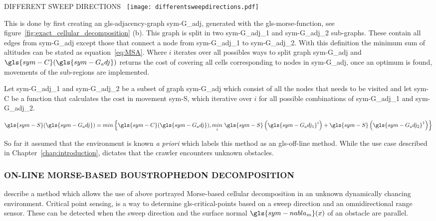 \begin{RoyalFigure}[!htb]{DIFFERENT SWEEP DIRECTIONS~\cite{huang_optimal_2001}}
    \texttt{[image: differentsweepdirections.pdf]}
\end{RoyalFigure}

This is done by first creating an \gls{gls-adjacency-graph} \gls{sym-G_adj}, generated with the
\gls{gls-morse-function}, see figure~\ref{fig:exact_cellular_decomposition} (b). This graph is split in two
\gls{sym-G_adj_1}  and \gls{sym-G_adj_2} sub-graphs. These contain all edges from \gls{sym-G_adj} except those that
connect a node from \gls{sym-G_adj_1} to \gls{sym-G_adj_2}. With this definition the minimum sum of altitudes can be
stated as equation~\ref{eq:MSA}. Where \( i \) iterates over all possibles ways to split graph \gls{sym-G_adj} and \(
\gls{sym-C}(\gls{sym-G_adj} ) \) returns the cost of covering all cells corresponding to nodes in \gls{sym-G_adj}, once
an optimum is found, movements of the sub-regions are implemented.

Let \gls{sym-G_adj_1} and \gls{sym-G_adj_2} be a subset of graph \gls{sym-G_adj} which consist of all the nodes that
needs to be visited and let \gls{sym-C} be a function that calculates the cost in movement \gls{sym-S}, which iterative
over \( i \) for all possible combinations of \gls{sym-G_adj_1} and \gls{sym-G_adj_2}.

\begin{equation}
    \label{eq:MSA}
    \gls{sym-S}(\gls{sym-G_adj}) = min \left\lbrace \gls{sym-C}(\gls{sym-G_adj}), \underset{i}{min}\  \gls{sym-S} \left(
    \gls{sym-G_adj_1}^i \right) + \gls{sym-S} \left( \gls{sym-G_adj_2}^1 \right) \right\rbrace
\end{equation}

So far it assumed that the environment is known \emph{a priori} which labels this method as an \gls{gls-off-line}
method. While the use case described in Chapter~\ref{chap:introduction}, dictates that the crawler encounters unknown
obstacles.

\subsubsection{ON-LINE MORSE-BASED BOUSTROPHEDON DECOMPOSITION}\label{subsec:onlinemorsebased}
\citet{acar_sensor_based_2002} describe a method which allows the use of above portrayed Morse-based cellular
decomposition in an unknown dynamically chancing environment. Critical point sensing, is a way to determine
\gls{gls-critical-point}s based on a sweep direction and an omnidirectional range sensor. These can be detected when
the sweep direction and the surface normal \( \gls{sym-nabla_m}(x) \) of an obstacle are parallel.

